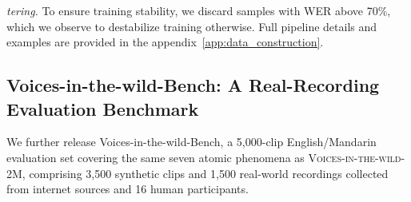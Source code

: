 \documentclass{article}
\begin{document}
\vspace{-1mm}
 \textit{tering.} To ensure training stability, we discard samples with WER above 70\%, 
which we observe to destabilize training otherwise. Full pipeline details and examples are provided in the appendix~\ref{app:data_construction}.

\vspace{-3mm}
\subsection{Voices-in-the-wild-Bench: A Real-Recording Evaluation Benchmark}
\vspace{-2mm}
We further release Voices-in-the-wild-Bench, a 5{,}000-clip English/Mandarin evaluation set covering the same seven atomic phenomena as \textsc{Voices-in-the-wild-2M}, comprising 3{,}500 synthetic clips and 1{,}500 real-world recordings collected from internet sources and 16 human participants.






\end{document}
